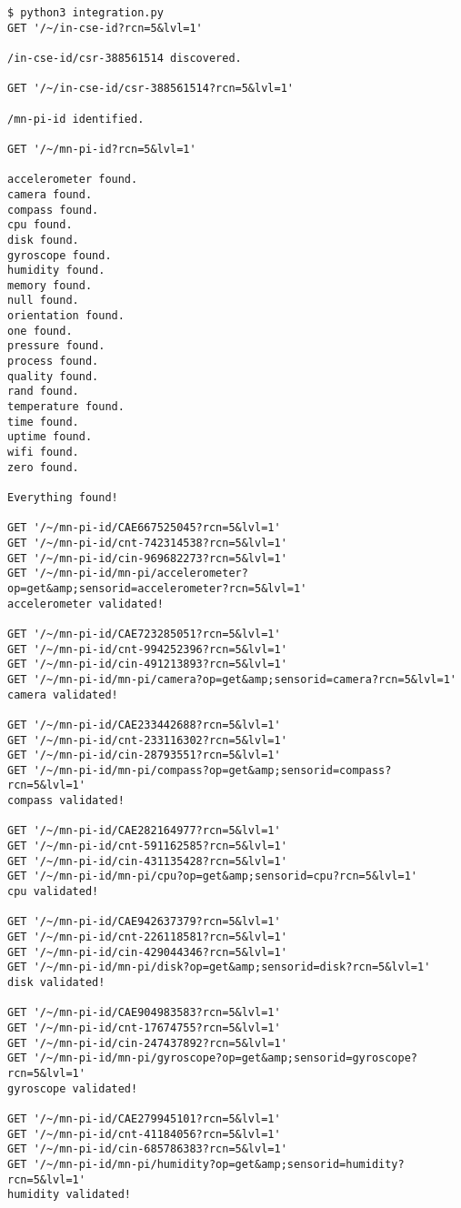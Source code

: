 \begin{lstlisting}
$ python3 integration.py
GET '/~/in-cse-id?rcn=5&lvl=1'

/in-cse-id/csr-388561514 discovered.

GET '/~/in-cse-id/csr-388561514?rcn=5&lvl=1'

/mn-pi-id identified.

GET '/~/mn-pi-id?rcn=5&lvl=1'

accelerometer found.
camera found.
compass found.
cpu found.
disk found.
gyroscope found.
humidity found.
memory found.
null found.
orientation found.
one found.
pressure found.
process found.
quality found.
rand found.
temperature found.
time found.
uptime found.
wifi found.
zero found.

Everything found!

GET '/~/mn-pi-id/CAE667525045?rcn=5&lvl=1'
GET '/~/mn-pi-id/cnt-742314538?rcn=5&lvl=1'
GET '/~/mn-pi-id/cin-969682273?rcn=5&lvl=1'
GET '/~/mn-pi-id/mn-pi/accelerometer?op=get&amp;sensorid=accelerometer?rcn=5&lvl=1'
accelerometer validated!

GET '/~/mn-pi-id/CAE723285051?rcn=5&lvl=1'
GET '/~/mn-pi-id/cnt-994252396?rcn=5&lvl=1'
GET '/~/mn-pi-id/cin-491213893?rcn=5&lvl=1'
GET '/~/mn-pi-id/mn-pi/camera?op=get&amp;sensorid=camera?rcn=5&lvl=1'
camera validated!

GET '/~/mn-pi-id/CAE233442688?rcn=5&lvl=1'
GET '/~/mn-pi-id/cnt-233116302?rcn=5&lvl=1'
GET '/~/mn-pi-id/cin-28793551?rcn=5&lvl=1'
GET '/~/mn-pi-id/mn-pi/compass?op=get&amp;sensorid=compass?rcn=5&lvl=1'
compass validated!

GET '/~/mn-pi-id/CAE282164977?rcn=5&lvl=1'
GET '/~/mn-pi-id/cnt-591162585?rcn=5&lvl=1'
GET '/~/mn-pi-id/cin-431135428?rcn=5&lvl=1'
GET '/~/mn-pi-id/mn-pi/cpu?op=get&amp;sensorid=cpu?rcn=5&lvl=1'
cpu validated!

GET '/~/mn-pi-id/CAE942637379?rcn=5&lvl=1'
GET '/~/mn-pi-id/cnt-226118581?rcn=5&lvl=1'
GET '/~/mn-pi-id/cin-429044346?rcn=5&lvl=1'
GET '/~/mn-pi-id/mn-pi/disk?op=get&amp;sensorid=disk?rcn=5&lvl=1'
disk validated!

GET '/~/mn-pi-id/CAE904983583?rcn=5&lvl=1'
GET '/~/mn-pi-id/cnt-17674755?rcn=5&lvl=1'
GET '/~/mn-pi-id/cin-247437892?rcn=5&lvl=1'
GET '/~/mn-pi-id/mn-pi/gyroscope?op=get&amp;sensorid=gyroscope?rcn=5&lvl=1'
gyroscope validated!

GET '/~/mn-pi-id/CAE279945101?rcn=5&lvl=1'
GET '/~/mn-pi-id/cnt-41184056?rcn=5&lvl=1'
GET '/~/mn-pi-id/cin-685786383?rcn=5&lvl=1'
GET '/~/mn-pi-id/mn-pi/humidity?op=get&amp;sensorid=humidity?rcn=5&lvl=1'
humidity validated!


\end{lstlisting}
